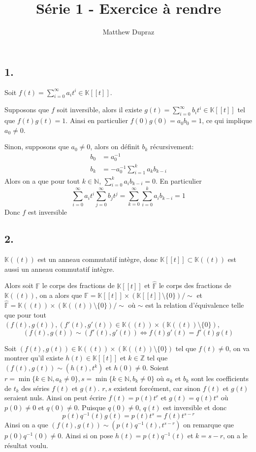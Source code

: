 \documentclass[french]{article}
\title{Série 1 - Exercice à rendre}
\author{Matthew Dupraz}
\newcommand{\K}{\mathbb{K}}
\newcommand{\N}{\mathbb{N}}
\newcommand{\F}{\mathbb{F}}
\newcommand{\Z}{\mathbb{Z}}
\newcommand{\hF}{\hat{\F}}
\newcommand{\KK}{\K[[t]]\times(\K[[t]]\setminus\{0\})}
\newcommand{\KKL}{\K((t))\times(\K((t))\setminus\{0\})}
\begin{document}
\maketitle

\subsection*{1.}

Soit $f(t) = \sum_{i=0}^\infty a_i t^i \in \K[[t]]$.

Supposons que $f$ soit inversible, alors il existe
$g(t) = \sum_{i=0}^\infty b_i t^i \in \K[[t]]$ tel que
$f(t)g(t) = 1$. Ainsi en particulier $f(0)g(0) = a_0 b_0 = 1$, 
ce qui implique $a_0 \neq 0$.

Sinon, supposons que $a_0 \neq 0$, alors on définit $b_k$ récursivement:
\begin{align*}
	b_0 &= a_0^{-1} \\
	b_k &= -a_0^{-1}\sum_{i=1}^{k}a_{k}b_{k - i}
\end{align*}
Alors on a que pour tout $k \in \N$, $\sum_{i=0}^k a_i b_{k-i} = 0$.
En particulier
\begin{equation*}
	\sum_{i=0}^\infty a_i t^i \sum_{j=0}^\infty b_j t^j
	= \sum_{k = 0}^\infty \sum_{i=0}^k a_i b_{k-i} = 1
\end{equation*}
Donc $f$ est inversible

\subsection*{2.}

$\K((t))$ est un anneau commutatif intègre, donc $\K[[t]] \subset \K((t))$
est aussi un anneau commutatif intègre.

Alors soit $\F$ le corps des fractions de $\K[[t]]$ et $\hat{\F}$ le corps des
fractions de $\K((t))$, on a alors que
$\F = \KK / \sim$  et
$\hF = \KKL / \sim$ où
$\sim$ est la relation d'équivalence telle que pour tout 
$(f(t), g(t)), (f'(t), g'(t)) \in \KKL$,
\begin{equation*}
	(f(t), g(t)) \sim (f'(t), g'(t)) \iff f(t)g'(t) = f'(t)g(t)
\end{equation*}

Soit $(f(t), g(t)) \in \KKL$ tel que $f(t) \neq 0$,
on va montrer qu'il existe 
$h(t) \in \K[[t]]$ et $k \in \Z$ tel que
$(f(t), g(t)) \sim (h(t), t^k)$ et $h(0) \neq 0$.
Soient 
$r = \min\{k \in \N, a_k \neq 0\}, s = \min\{k \in \N, b_k \neq 0\}$ où $a_k$ et
$b_k$ sont les coefficients de $t_k$ des séries $f(t)$ et $g(t)$.
$r, s$ existent forcément, car sinon $f(t)$ et $g(t)$ seraient nuls.
Ainsi on peut écrire $f(t) = p(t)t^r$ et $g(t) = q(t)t^s$ où
$p(0) \neq 0$ et $q(0) \neq 0$. Puisque $q(0) \neq 0$, $q(t)$ est inversible
et donc 
\begin{equation*}
	p(t)q^{-1}(t)g(t) = p(t)t^{s} = f(t)t^{s-r} 
\end{equation*}
Ainsi on a que $(f(t), g(t)) \sim (p(t)q^{-1}(t), t^{s-r})$ on remarque que 
$p(0)q^{-1}(0) \neq 0$. Ainsi si on pose $h(t) = p(t)q^{-1}(t)$ et $k = s-r$,
on a le résultat voulu.
\end{document}
